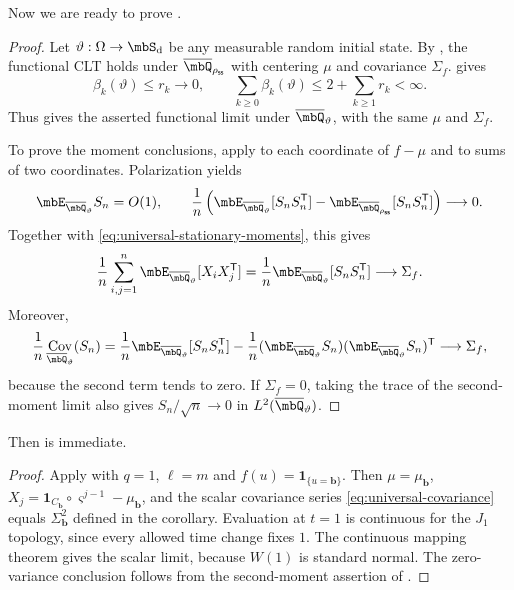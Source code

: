 \documentclass[a4paper]{article}
\numberwithin{equation}{section}   %
\theoremstyle{plain}   %
\theoremstyle{plain}   %
\theoremstyle{examplestyle}
\DeclareMathOperator{\states}{\mbS_d}   %
\newcommand{\s}{\rho_{\mathsf{ss}}}     %
\DeclareMathOperator{\Cov}{Cov}
\begin{document}
Now we are ready to prove . 

\univannealedclt*

\begin{proof}
    Let $\vartheta:\Omega\to\states$ be any measurable random initial state.
    By , the functional CLT holds under $\overline\mbQ_{\s}$ with
    centering $\mu$ and covariance $\Sigma_f$.
     gives
    \[
     \beta_k(\vartheta)\le r_k\longrightarrow0,
     \qquad
     \sum_{k\ge0}\beta_k(\vartheta)
     \le2+\sum_{k\ge1}r_k<\infty.
    \]
    Thus  gives the asserted functional limit under
    $\overline\mbQ_\vartheta$, with the same $\mu$ and $\Sigma_f$.
    
    To prove the moment conclusions, apply  to each
    coordinate of $f-\mu$ and to sums of two coordinates. Polarization yields
    \[
     \mbE_{\overline\mbQ_\vartheta}S_n=O(1),
     \qquad
     \frac1n\left(
       \mbE_{\overline\mbQ_\vartheta}[S_nS_n^{\mathsf T}]
       -\mbE_{\overline\mbQ_{\s}}[S_nS_n^{\mathsf T}]
     \right)\longrightarrow0.
    \]
    Together with \eqref{eq:universal-stationary-moments}, this gives
    \[
     \frac1n\sum_{i,j=1}^n
       \mbE_{\overline\mbQ_\vartheta}[X_iX_j^{\mathsf T}]
     =\frac1n\mbE_{\overline\mbQ_\vartheta}[S_nS_n^{\mathsf T}]
     \longrightarrow\Sigma_f.
    \]
    Moreover,
    \[
     \frac1n\Cov_{\overline\mbQ_\vartheta}(S_n)
     =\frac1n\mbE_{\overline\mbQ_\vartheta}[S_nS_n^{\mathsf T}]
      -\frac1n
        (\mbE_{\overline\mbQ_\vartheta}S_n)
        (\mbE_{\overline\mbQ_\vartheta}S_n)^{\mathsf T}
     \longrightarrow\Sigma_f,
    \]
    because the second term tends to zero. If $\Sigma_f=0$, taking the trace
    of the second-moment limit also gives $S_n/\sqrt n\to0$ in
    $L^2(\overline\mbQ_\vartheta)$.
\end{proof}

Then  is immediate. 

\universalcltA*

\begin{proof}
    Apply  with $q=1$, $\ell=m$ and $f(u)=\mathbf1_{\{u=\pmb b\}}$. Then $\mu=\mu_{\pmb b}$, $X_j=\mathbf1_{C_{\pmb b}}\circ\varsigma^{j-1}-\mu_{\pmb b}$, and the scalar covariance series \eqref{eq:universal-covariance} equals $\Sigma_{\pmb b}^2$ defined in the corollary.
    Evaluation at $t=1$ is continuous for the $J_1$ topology, since every allowed time change fixes $1$. 
    The continuous mapping theorem gives the scalar limit, because $W(1)$ is standard normal. 
    The zero-variance conclusion follows from the second-moment assertion of .
\end{proof}
\end{document}
